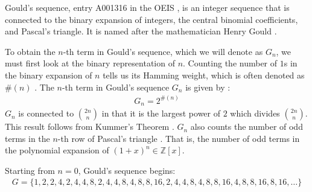 \documentclass{article}
\theoremstyle{plain}
\theoremstyle{definition}
\newcommand{\Z}{\mathbb{Z}}
\newcommand{\wt}[1]{\#(#1)}
\begin{document}
Gould's sequence, entry A001316 in the OEIS \cite{A001316}, is an integer sequence that is connected to the binary expansion of integers, the central binomial coefficients, and Pascal's triangle. It is named after the mathematician Henry Gould \cite{A001316}.

To obtain the $n$-th term in Gould's sequence, which we will denote as $G_n$, we must first look at the binary representation of $n$. Counting the number of $1$s in the binary expansion of $n$ tells us its Hamming weight, which is often denoted as $\wt{n}$ \cite{Lin2004}. The $n$-th term in Gould's sequence $G_n$ is given by \cite{A001316}:
\begin{align}
    G_n = 2^{\wt{n}}
\end{align}
$G_n$ is connected to $\binom{2n}{n}$ in that it is the largest power of $2$ which divides $\binom{2n}{n}$. This result follows from Kummer's Theorem \cite{Kummer1857}. $G_n$ also counts the number of odd terms in the $n$-th row of Pascal's triangle \cite{Glaisher1899}. That is, the number of odd terms in the polynomial expansion of $(1+x)^n \in \Z[x]$.

Starting from $n=0$, Gould's sequence begins:
\begin{align*}
    G = \{ 1, 2, 2, 4, 2, 4, 4, 8, 2, 4, 4, 8, 4, 8, 8, 16, 2, 4, 4, 8, 4, 8, 8, 16, 4, 8, 8, 16, 8, 16, \ldots \}
\end{align*}
\end{document}
